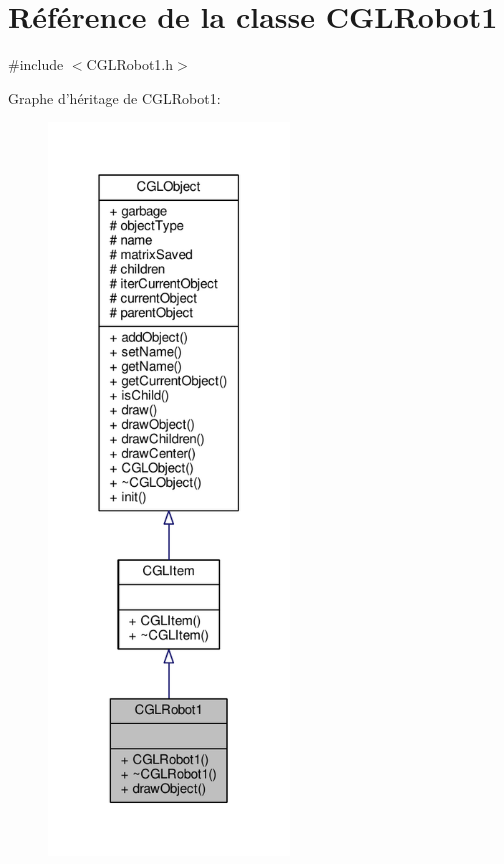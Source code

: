 \hypertarget{class_c_g_l_robot1}{\section{Référence de la classe C\-G\-L\-Robot1}
\label{class_c_g_l_robot1}
}


{\ttfamily \#include $<$C\-G\-L\-Robot1.\-h$>$}



Graphe d'héritage de C\-G\-L\-Robot1\-:\nopagebreak
\begin{figure}[H]
\begin{center}
\leavevmode
\includegraphics[height=550pt]{d2/dcc/class_c_g_l_robot1__inherit__graph}
\end{center}
\end{figure}


